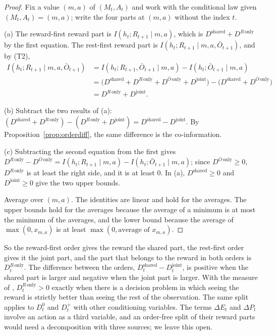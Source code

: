 \documentclass{article}
\theoremstyle{definition}
\theoremstyle{remark}
\newcommand{\dE}{\Delta E}
\newcommand{\dP}{\Delta P}
\newcommand{\Ob}{\bar O}
\newcommand{\why}[1]{\tag*{\small(#1)}}
\begin{document}
\begin{proof}
Fix a value $(m,a)$ of $(M_t,A_t)$ and work with the conditional law given $(M_t,A_t)=(m,a)$; write the four parts at $(m,a)$ without the index $t$.

(a) The reward-first reward part is $I(h_t;R_{t+1}\mid m,a)$, which is $D^{\mathrm{shared}}+D^{R\,\mathrm{only}}$ by the first equation. The rest-first reward part is $I(h_t;R_{t+1}\mid m,a,\Ob_{t+1})$, and by (T2),
\begin{align*}
I(h_t;R_{t+1}\mid m,a,\Ob_{t+1})&=I(h_t;R_{t+1},\Ob_{t+1}\mid m,a)-I(h_t;\Ob_{t+1}\mid m,a) \why{T2}\\
&=\big(D^{\mathrm{shared}}+D^{R\,\mathrm{only}}+D^{\Ob\,\mathrm{only}}+D^{\mathrm{joint}}\big)-\big(D^{\mathrm{shared}}+D^{\Ob\,\mathrm{only}}\big) \why{third and second equations}\\
&=D^{R\,\mathrm{only}}+D^{\mathrm{joint}}.
\end{align*}

(b) Subtract the two results of (a): $(D^{\mathrm{shared}}+D^{R\,\mathrm{only}})-(D^{R\,\mathrm{only}}+D^{\mathrm{joint}})=D^{\mathrm{shared}}-D^{\mathrm{joint}}$. By Proposition~\ref{prop:orderdiff}, the same difference is the co-information.

(c) Subtracting the second equation from the first gives $D^{R\,\mathrm{only}}-D^{\Ob\,\mathrm{only}}=I(h_t;R_{t+1}\mid m,a)-I(h_t;\Ob_{t+1}\mid m,a)$; since $D^{\Ob\,\mathrm{only}}\ge0$, $D^{R\,\mathrm{only}}$ is at least the right side, and it is at least $0$. In (a), $D^{\mathrm{shared}}\ge0$ and $D^{\mathrm{joint}}\ge0$ give the two upper bounds.

Average over $(m,a)$. The identities are linear and hold for the averages. The upper bounds hold for the averages because the average of a minimum is at most the minimum of the averages, and the lower bound because the average of $\max(0,x_{m,a})$ is at least $\max(0,\text{average of }x_{m,a})$.
\end{proof}

So the reward-first order gives the reward the shared part, the rest-first order gives it the joint part, and the part that belongs to the reward in both orders is $D^{R\,\mathrm{only}}_t$. The difference between the orders, $D^{\mathrm{shared}}_t-D^{\mathrm{joint}}_t$, is positive when the shared part is larger and negative when the joint part is larger. With the measure of \citet{bertschinger2014quantifying}, $D^{R\,\mathrm{only}}_t>0$ exactly when there is a decision problem in which seeing the reward is strictly better than seeing the rest of the observation. The same split applies to $D^0_t$ and $D^+_t$ with other conditioning variables. The terms $\dE_t$ and $\dP_t$ involve an action as a third variable, and an order-free split of their reward parts would need a decomposition with three sources; we leave this open.
\end{document}
